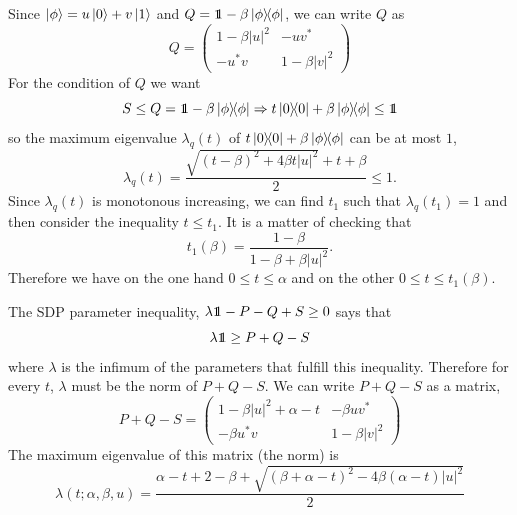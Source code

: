 \documentclass[10pt, a4paper]{amsart}
\begin{document}
Since $\left| \phi\right\rangle = u \left| 0\right\rangle + v\left| 1\right\rangle$ and $Q = \bbone -\beta \projector{\phi}$, we can write $Q$ as 
$$
Q = 
\begin{pmatrix}
1-\beta |u|^{2} & -u v^{*}\\
-u^{*}v & 1 - \beta |v|^{2} 
\end{pmatrix}
$$
For the condition of $Q$ we want 
$$
S \leq Q = \bbone - \beta \projector{\phi} \Rightarrow  t\projector{0} +\beta \projector{\phi} \leq \bbone
$$
so the maximum eigenvalue $\lambda_{q}(t)$ of $t\left| 0\right\rangle\!\!\left\langle 0\right| +\beta\left| \phi\right\rangle\!\!\left\langle \phi\right|$ can be at most $1$,
$$
\lambda_{q}(t) = \dfrac{\sqrt{(t-\beta)^2  +4 \beta t |u|^2}+t+\beta}{2}\leq 1 . 
$$
Since $\lambda_{q}(t)$ is monotonous increasing, we can find $t_{1}$ such that $\lambda_{q}(t_{1}) = 1$ and then consider the inequality $t\leq t_{1}$. It is a matter of checking that 
$$
t_{1}(\beta) = \dfrac{1-\beta}{1-\beta + \beta |u|^{2}}.
$$
Therefore we have on the one hand $ 0\leq t \leq \alpha$ and on the other $0\leq t\leq t_{1}(\beta)$. 

The SDP parameter inequality, $\lambda \bbone - P - Q + S \geq 0 $ says that 
$$
\lambda \bbone \geq P + Q -S
$$
where $\lambda$ is the infimum of the parameters that fulfill this inequality. Therefore for every $t$, $\lambda$ must be the norm of $P+Q-S$. 
We can write $P+Q-S$ as a matrix,
$$
P + Q - S = 
\begin{pmatrix}
1-\beta |u|^{2} + \alpha - t & -\beta u v^{*}\\
-\beta u^{*}v & 1 - \beta |v|^{2} 
\end{pmatrix}
$$
The maximum eigenvalue of this matrix (the norm) is 
$$
 \lambda(t; \alpha, \beta,u)  = 
\dfrac{\alpha-t+2-\beta
+
\sqrt{
(\beta+ \alpha - t)^{2}
-
4\beta (  \alpha -t  )|u|^2}
}{2}
$$
\end{document}
